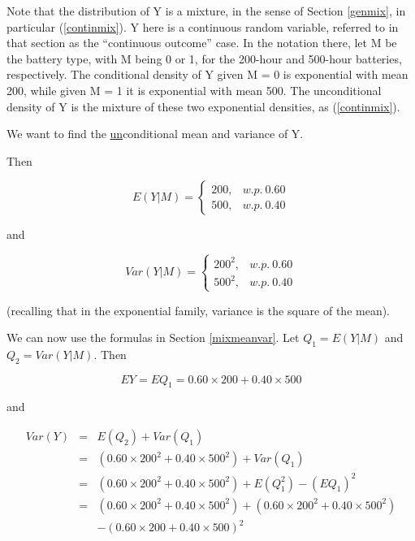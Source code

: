 \documentclass[11pt]{article}
\begin{document}
Note that the distribution of Y is a mixture, in the sense of Section
\ref{genmix}, in particular (\ref{continmix}).  Y here is a continuous
random variable, referred to in that section as the ``continuous
outcome'' case.   In the notation there, let M be the battery type, with
M being 0 or 1, for the 200-hour and 500-hour batteries, respectively.
The conditional density of Y given M = 0 is exponential with mean 200,
while given M = 1 it is exponential with mean 500.  The unconditional
density of Y is the mixture of these two exponential densities, as 
(\ref{continmix}).

We want to find the \underline{un}conditional mean and variance of Y.

Then

\begin{equation}
\label{batt1}
E(Y|M)=\left\{ \begin{array}{rl}
200, & w.p. ~ 0.60 \\
500, & w.p. ~ 0.40
\end{array}\right. 
\end{equation}

and 

\begin{equation}
\label{batt2}
Var(Y|M)=\left\{ \begin{array}{rl}
200^2, & w.p. ~ 0.60 \\
500^2, & w.p. ~ 0.40
\end{array}\right. 
\end{equation}

(recalling that in the exponential family, variance is the square of the
mean).

We can now use the formulas in Section \ref{mixmeanvar}.  Let $Q_1 =
E(Y|M)$  and $Q_2 = Var(Y|M)$.  Then

\begin{equation}
EY = EQ_1 = 0.60 \times 200 + 0.40 \times 500
\end{equation}

and 

\begin{eqnarray}
Var(Y) &=& E(Q_2) + Var(Q_1) \\
&=& (0.60 \times 200^2 + 0.40 \times 500^2) + Var(Q_1) \\
&=& (0.60 \times 200^2 + 0.40 \times 500^2) + E(Q_1^2) - (EQ_1)^2 \\
&=& (0.60 \times 200^2 + 0.40 \times 500^2) + (0.60 \times 200^2 + 0.40
\times 500^2)  \\
& & - (0.60 \times 200 + 0.40 \times 500)^2 \\
\end{eqnarray}
\end{document}

